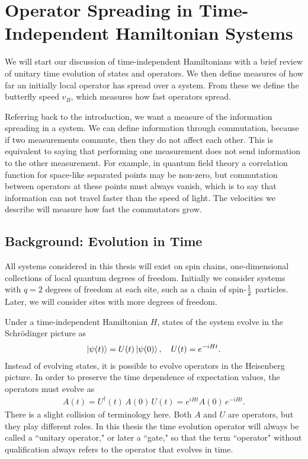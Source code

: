 \section{Operator Spreading in Time-Independent Hamiltonian Systems} \label{sec:opsp}

We will start our discussion of time-independent Hamiltonians with a brief review of unitary time evolution of states and operators. We then define measures of how far an initially local operator has spread over a system. From these we define the butterfly speed $v_B$, which measures how fast operators spread.

Referring back to the introduction, we want a measure of the information spreading in a system. We can define information through commutation, because if two measurements commute, then they do not affect each other. This is equivalent to saying that performing one measurement does not send information to the other measurement. For example, in quantum field theory a correlation function for space-like separated points may be non-zero, but commutation between operators at these points must always vanish, which is to say that information can not travel faster than the speed of light. The velocities we describe will measure how fast the commutators grow.

\subsection{Background: Evolution in Time} \label{sub:evoltime}

All systems considered in this thesis will exist on spin chains, one-dimensional collections of  local quantum degrees of freedom. Initially we consider systems with $q=2$ degrees of freedom at each site, such as a chain of spin-$\frac{1}{2}$ particles. Later, we will consider sites with more degrees of freedom. 

Under a time-independent Hamiltonian $H$, states of the system evolve in the Schr\"odinger picture as 
\begin{align}
\left|\psi(t)\right\rangle = U(t)\left|\psi(0)\right\rangle,\quad U(t) = e^{-iHt}. \label{eqn:shro}
\end{align}
Instead of evolving states, it is possible to evolve operators in the Heisenberg picture. In order to preserve the time dependence of expectation values, the operators must evolve as 
\begin{align}
A(t) = U^\dag(t)\,A(0)\,U(t) = e^{iHt}A(0)\,e^{-iHt}.\label{eqn:heis}
\end{align}
There is a slight collision of terminology here. Both $A$ and $U$ are operators, but they play different roles. In this thesis the time evolution operator will always be called a ``unitary operator," or later a ``gate," so that the term ``operator" without qualification always refers to the operator that evolves in time.

